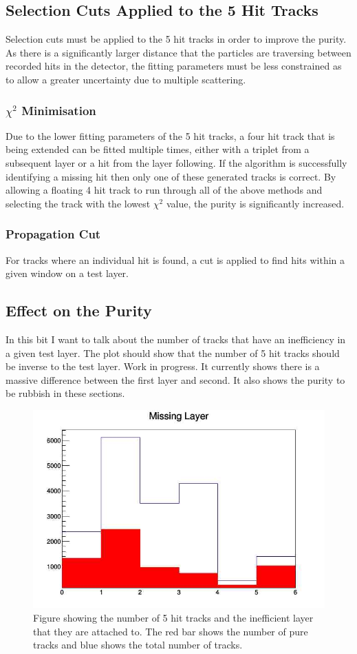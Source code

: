 \subsection{Selection Cuts Applied to the 5 Hit Tracks}
Selection cuts must be applied to the 5 hit tracks in order to improve the purity. As there is a significantly larger distance that the particles are traversing between recorded hits in the detector, the fitting parameters must be less constrained as to allow a greater uncertainty due to multiple scattering.
\subsubsection{$\chi^{2}$ Minimisation}
Due to the lower fitting parameters of the 5 hit tracks, a four hit track that is being extended can be fitted multiple times, either with a triplet from a subsequent layer or a hit from the layer following. If the algorithm is successfully identifying a missing hit then only one of these generated tracks is correct.
By allowing a floating 4 hit track to run through all of the above methods and selecting the track with the lowest $\chi^{2}$ value, the purity is significantly increased.
\subsubsection{Propagation Cut}
For tracks where an individual hit is found, a cut is applied to find hits within a given window on a test layer.
\subsection{Effect on the Purity}
In this bit I want to talk about the number of tracks that have an inefficiency in a given test layer. The plot should show that the number of 5 hit tracks should be inverse to the test layer. Work in progress.
It currently shows there is a massive difference between the first layer and second. It also shows the purity to be rubbish in these sections.
\begin{figure}
    \centering
    \includegraphics[scale=0.5]{fig/tracking/l.jpeg}
    \caption{Figure showing the number of 5 hit tracks and the inefficient layer that they are attached to. The red bar shows the number of pure tracks and blue shows the total number of tracks.}
    \label{fig:lay}
\end{figure}

